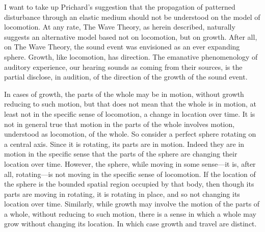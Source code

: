 

I want to take up Prichard's suggestion that the propagation of patterned disturbance through an elastic medium should not be understood on the model of locomotion. At any rate, The Wave Theory, as herein described, naturally suggests an alternative model based not on locomotion, but on growth. After all, on The Wave Theory, the sound event was envisioned as an ever expanding sphere. Growth, like locomotion, has direction. The emanative phenomenology of auditory experience, our hearing sounds as coming from their sources, is the partial disclose, in audition, of the direction of the growth of the sound event.

In cases of growth, the parts of the whole may be in motion, without growth reducing to such motion, but that does not mean that the whole is in motion, at least not in the specific sense of locomotion, a change in location over time. It is not in general true that motion in the parts of the whole involves motion, understood as locomotion, of the whole. So consider a perfect sphere rotating on a central axis. Since it is rotating, its parts are in motion. Indeed they are in motion in the specific sense that the parts of the sphere are changing their location over time. However, the sphere, while moving in some sense---it is, after all, rotating---is not moving in the specific sense of locomotion. If the location of the sphere is the bounded spatial region occupied by that body, then though its parts are moving in rotating, it is rotating in place, and so not changing its location over time. Similarly, while growth may involve the motion of the parts of a whole, without reducing to such motion, there is a sense in which a whole may grow without changing its location. In which case growth and travel are distinct.

